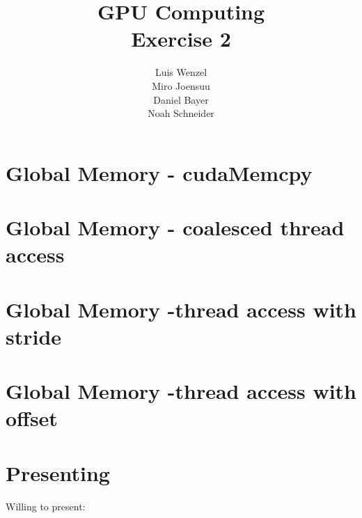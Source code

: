 \documentclass[12pt,twoside,a4paper]{article}
\title{GPU Computing\\
Exercise 2}
\author{
  Luis Wenzel\\
  Miro Joensuu\\
  Daniel Bayer\\
  Noah Schneider
}
\date{}
\begin{document}
\maketitle
\section{Global Memory - cudaMemcpy}


\section{Global Memory - coalesced thread access}
	

\section{Global Memory -thread access with stride}



\section{Global Memory -thread access with offset}

\FloatBarrier

\section{Presenting}
Willing to present:\\
\end{document}
